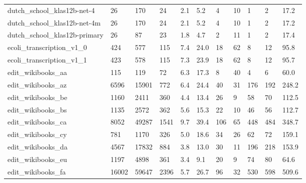 \begin{longtable}{lllllllllll}
 dutch\_school\_klas12b-net-4                         & 26         & 170       & 24    & 2.1    & 5.2    & 4     & 10     & 1      & 2      & 17.2    \\
 dutch\_school\_klas12b-net-4m                        & 26         & 170       & 24    & 2.1    & 5.2    & 4     & 10     & 1      & 2      & 17.2    \\
 dutch\_school\_klas12b-primary                       & 26         & 87        & 23    & 1.8    & 4.7    & 2     & 11     & 1      & 2      & 17.4    \\
 ecoli\_transcription\_v1\_0                           & 424        & 577       & 115   & 7.4    & 24.0   & 18    & 62     & 8      & 12     & 95.8    \\
 ecoli\_transcription\_v1\_1                           & 423        & 578       & 115   & 7.3    & 23.9   & 18    & 62     & 8      & 12     & 95.7    \\
 edit\_wikibooks\_aa                                  & 115        & 119       & 72    & 6.3    & 17.3   & 8     & 40     & 4      & 6      & 60.0    \\
 edit\_wikibooks\_az                                  & 6596       & 15901     & 772   & 6.4    & 24.4   & 40    & 31     & 176    & 192    & 248.2   \\
 edit\_wikibooks\_be                                  & 1160       & 2411      & 360   & 4.4    & 13.4   & 26    & 9      & 58     & 70     & 112.5   \\
 edit\_wikibooks\_bs                                  & 1135       & 2572      & 362   & 5.6    & 15.3   & 22    & 10     & 46     & 56     & 112.7   \\
 edit\_wikibooks\_ca                                  & 8052       & 49287     & 1541  & 9.7    & 39.4   & 106   & 65     & 448    & 484    & 348.7   \\
 edit\_wikibooks\_cy                                  & 781        & 1170      & 326   & 5.0    & 18.6   & 34    & 26     & 62     & 72     & 159.1   \\
 edit\_wikibooks\_da                                  & 4567       & 17832     & 884   & 3.8    & 13.0   & 30    & 11     & 196    & 218    & 153.9   \\
 edit\_wikibooks\_eu                                  & 1197       & 4898      & 361   & 3.4    & 9.1    & 20    & 9      & 74     & 80     & 64.6    \\
 edit\_wikibooks\_fa                                  & 16002      & 59647     & 2396  & 5.7    & 26.7   & 96    & 32     & 530    & 598    & 509.6   \\

\end{longtable}
